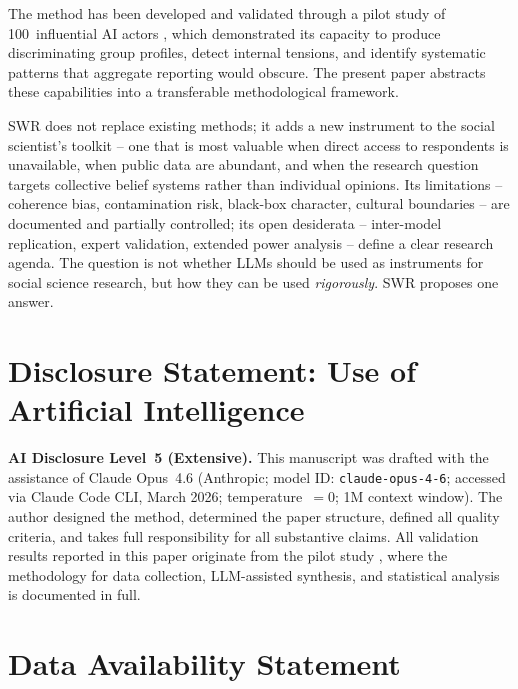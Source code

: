 \documentclass[11pt,a4paper]{article}
\begin{document}
The method has been developed and validated through a pilot study of 100~influential AI actors \citep{Geiger2026PaperA}, which demonstrated its capacity to produce discriminating group profiles, detect internal tensions, and identify systematic patterns that aggregate reporting would obscure. The present paper abstracts these capabilities into a transferable methodological framework.

SWR does not replace existing methods; it adds a new instrument to the social scientist's toolkit -- one that is most valuable when direct access to respondents is unavailable, when public data are abundant, and when the research question targets collective belief systems rather than individual opinions. Its limitations -- coherence bias, contamination risk, black-box character, cultural boundaries -- are documented and partially controlled; its open desiderata -- inter-model replication, expert validation, extended power analysis -- define a clear research agenda. The question is not whether LLMs should be used as instruments for social science research, but how they can be used \emph{rigorously}. SWR proposes one answer.


\section*{Disclosure Statement: Use of Artificial Intelligence}

\noindent\textbf{AI Disclosure Level~5 (Extensive).}
This manuscript was drafted with the assistance of Claude Opus~4.6 (Anthropic; model ID: \texttt{claude-opus-4-6}; accessed via Claude Code CLI, March 2026; temperature~$= 0$; 1M context window). The author designed the method, determined the paper structure, defined all quality criteria, and takes full responsibility for all substantive claims. All validation results reported in this paper originate from the pilot study \citep{Geiger2026PaperA}, where the methodology for data collection, LLM-assisted synthesis, and statistical analysis is documented in full.


\section*{Data Availability Statement}
\end{document}
